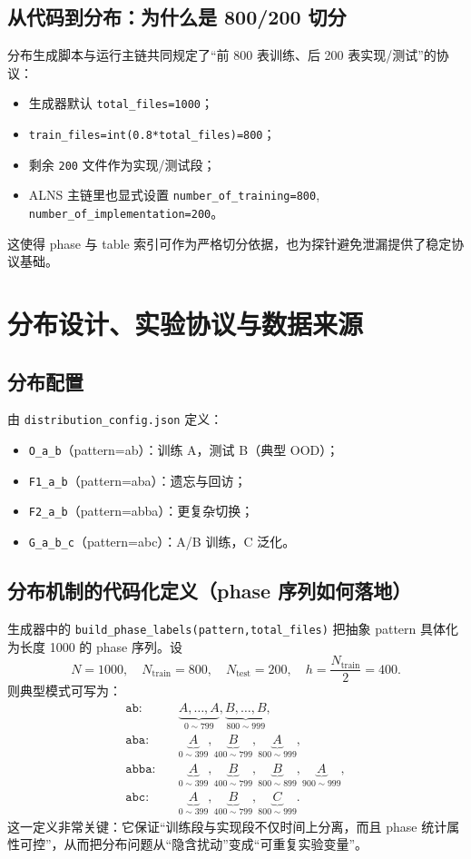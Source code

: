 ﻿\documentclass[11pt,a4paper]{ctexart}
\begin{document}
\subsection{从代码到分布：为什么是 800/200 切分}
分布生成脚本与运行主链共同规定了“前 800 表训练、后 200 表实现/测试”的协议：
\begin{itemize}
  \item 生成器默认 \texttt{total\_files=1000}；
  \item \texttt{train\_files=int(0.8*total\_files)=800}；
  \item 剩余 \texttt{200} 文件作为实现/测试段；
  \item ALNS 主链里也显式设置 \texttt{number\_of\_training=800},
  \texttt{number\_of\_implementation=200}。
\end{itemize}
这使得 phase 与 table 索引可作为严格切分依据，也为探针避免泄漏提供了稳定协议基础。

\section{分布设计、实验协议与数据来源}
\subsection{分布配置}
由 \texttt{distribution\_config.json} 定义：
\begin{itemize}
  \item \texttt{O\_a\_b}（pattern=ab）：训练 A，测试 B（典型 OOD）；
  \item \texttt{F1\_a\_b}（pattern=aba）：遗忘与回访；
  \item \texttt{F2\_a\_b}（pattern=abba）：更复杂切换；
  \item \texttt{G\_a\_b\_c}（pattern=abc）：A/B 训练，C 泛化。
\end{itemize}

\subsection{分布机制的代码化定义（phase 序列如何落地）}
生成器中的 \texttt{build\_phase\_labels(pattern,total\_files)} 把抽象 pattern 具体化为长度 1000 的 phase 序列。设
\begin{equation}
N=1000,\quad N_{\text{train}}=800,\quad N_{\text{test}}=200,\quad h=\frac{N_{\text{train}}}{2}=400.
\end{equation}
则典型模式可写为：
\begin{align}
\texttt{ab}:&\quad \underbrace{A,\ldots,A}_{0\sim799},\underbrace{B,\ldots,B}_{800\sim999},\\
\texttt{aba}:&\quad \underbrace{A}_{0\sim399},\underbrace{B}_{400\sim799},\underbrace{A}_{800\sim999},\\
\texttt{abba}:&\quad \underbrace{A}_{0\sim399},\underbrace{B}_{400\sim799},\underbrace{B}_{800\sim899},\underbrace{A}_{900\sim999},\\
\texttt{abc}:&\quad \underbrace{A}_{0\sim399},\underbrace{B}_{400\sim799},\underbrace{C}_{800\sim999}.
\end{align}
这一定义非常关键：它保证“训练段与实现段不仅时间上分离，而且 phase 统计属性可控”，从而把分布问题从“隐含扰动”变成“可重复实验变量”。
\end{document}
